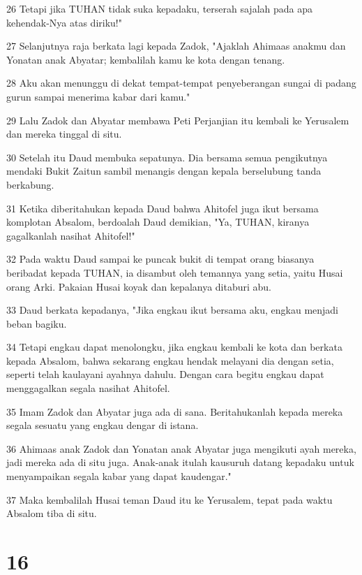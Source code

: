 \par 26 Tetapi jika TUHAN tidak suka kepadaku, terserah sajalah pada apa kehendak-Nya atas diriku!"
\par 27 Selanjutnya raja berkata lagi kepada Zadok, "Ajaklah Ahimaas anakmu dan Yonatan anak Abyatar; kembalilah kamu ke kota dengan tenang.
\par 28 Aku akan menunggu di dekat tempat-tempat penyeberangan sungai di padang gurun sampai menerima kabar dari kamu."
\par 29 Lalu Zadok dan Abyatar membawa Peti Perjanjian itu kembali ke Yerusalem dan mereka tinggal di situ.
\par 30 Setelah itu Daud membuka sepatunya. Dia bersama semua pengikutnya mendaki Bukit Zaitun sambil menangis dengan kepala berselubung tanda berkabung.
\par 31 Ketika diberitahukan kepada Daud bahwa Ahitofel juga ikut bersama komplotan Absalom, berdoalah Daud demikian, "Ya, TUHAN, kiranya gagalkanlah nasihat Ahitofel!"
\par 32 Pada waktu Daud sampai ke puncak bukit di tempat orang biasanya beribadat kepada TUHAN, ia disambut oleh temannya yang setia, yaitu Husai orang Arki. Pakaian Husai koyak dan kepalanya ditaburi abu.
\par 33 Daud berkata kepadanya, "Jika engkau ikut bersama aku, engkau menjadi beban bagiku.
\par 34 Tetapi engkau dapat menolongku, jika engkau kembali ke kota dan berkata kepada Absalom, bahwa sekarang engkau hendak melayani dia dengan setia, seperti telah kaulayani ayahnya dahulu. Dengan cara begitu engkau dapat menggagalkan segala nasihat Ahitofel.
\par 35 Imam Zadok dan Abyatar juga ada di sana. Beritahukanlah kepada mereka segala sesuatu yang engkau dengar di istana.
\par 36 Ahimaas anak Zadok dan Yonatan anak Abyatar juga mengikuti ayah mereka, jadi mereka ada di situ juga. Anak-anak itulah kausuruh datang kepadaku untuk menyampaikan segala kabar yang dapat kaudengar."
\par 37 Maka kembalilah Husai teman Daud itu ke Yerusalem, tepat pada waktu Absalom tiba di situ.

\chapter{16}

